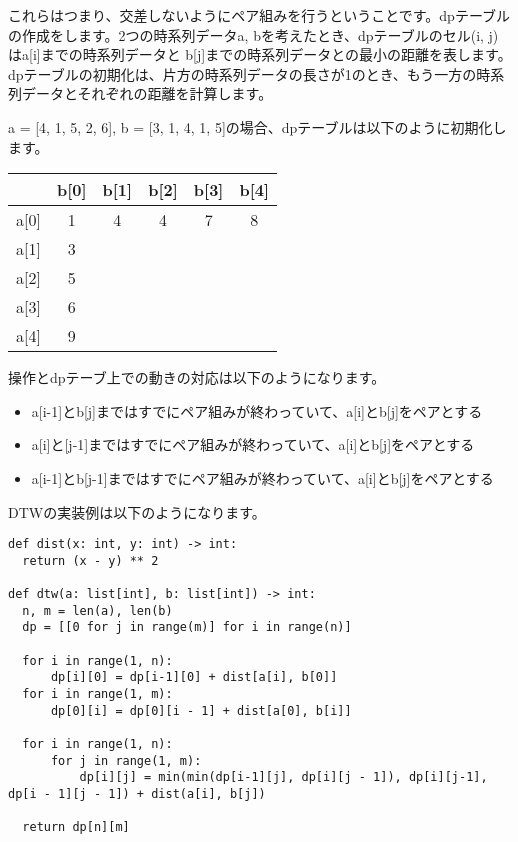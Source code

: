 \documentclass{jlreq}
\begin{document}
これらはつまり、交差しないようにペア組みを行うということです。dpテーブルの作成をします。2つの時系列データa, bを考えたとき、dpテーブルのセル(i, j)はa[i]までの時系列データと
b[j]までの時系列データとの最小の距離を表します。dpテーブルの初期化は、片方の時系列データの長さが1のとき、もう一方の時系列データとそれぞれの距離を計算します。

a = [4, 1, 5, 2, 6], b = [3, 1, 4, 1, 5]の場合、dpテーブルは以下のように初期化します。

\vspace{0.5cm}

\begin{table}[h]
  \centering
  \begin{tabular}{c|c|c|c|c|c|}
    & b[0] & b[1] & b[2] & b[3] & b[4]\\
    \hline
    a[0]&  1 & 4 & 4 & 7  & 8\\
    \hline
    a[1]&  3 &  &  &   & \\
    \hline
    a[2]&  5 &  &  &  & \\
    \hline
    a[3]&  6 &  &  &   & \\
    \hline
    a[4]&  9 &  &  &   & \\
    \hline
  \end{tabular}
\end{table}

\vspace{0.5cm}

操作とdpテーブ上での動きの対応は以下のようになります。

\begin{itemize}
  \item a[i-1]とb[j]まではすでにペア組みが終わっていて、a[i]とb[j]をペアとする
  \item a[i]と[j-1]まではすでにペア組みが終わっていて、a[i]とb[j]をペアとする
  \item a[i-1]とb[j-1]まではすでにペア組みが終わっていて、a[i]とb[j]をペアとする
\end{itemize}

DTWの実装例は以下のようになります。
\begin{lstlisting}[caption=DTWの実装, frame=TRBL, label={dtw}]
def dist(x: int, y: int) -> int:
  return (x - y) ** 2

def dtw(a: list[int], b: list[int]) -> int:
  n, m = len(a), len(b)
  dp = [[0 for j in range(m)] for i in range(n)]
  
  for i in range(1, n):
      dp[i][0] = dp[i-1][0] + dist[a[i], b[0]]
  for i in range(1, m):
      dp[0][i] = dp[0][i - 1] + dist[a[0], b[i]]
  
  for i in range(1, n):
      for j in range(1, m):
          dp[i][j] = min(min(dp[i-1][j], dp[i][j - 1]), dp[i][j-1], dp[i - 1][j - 1]) + dist(a[i], b[j])
  
  return dp[n][m]
\end{lstlisting}
\end{document}
